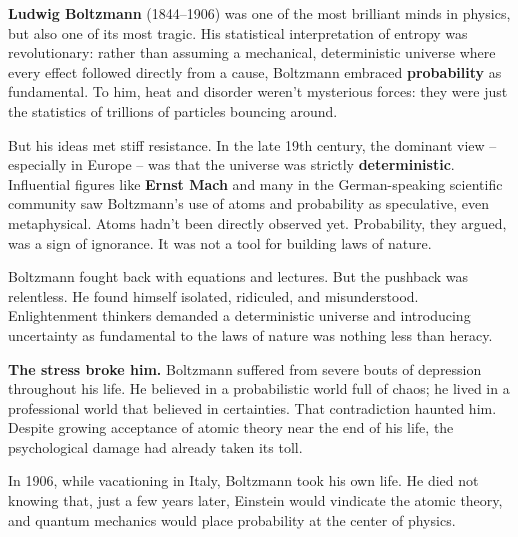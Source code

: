 \begin{tcolorbox}[colback=gray!5!white, colframe=black!75!white, title={Historical Sidebar: Boltzmann vs. the Universe (and the Universe Won)}]

  \textbf{Ludwig Boltzmann} (1844–1906) was one of the most brilliant minds in physics, but also one of its most tragic. His statistical interpretation of entropy was revolutionary: rather than assuming a mechanical, deterministic universe where every effect followed directly from a cause, Boltzmann embraced \textbf{probability} as fundamental. To him, heat and disorder weren’t mysterious forces: they were just the statistics of trillions of particles bouncing around.
  
  \medskip
  
  But his ideas met stiff resistance. In the late 19th century, the dominant view -- especially in Europe -- was that the universe was strictly \textbf{deterministic}. Influential figures like \textbf{Ernst Mach} and many in the German-speaking scientific community saw Boltzmann’s use of atoms and probability as speculative, even metaphysical. Atoms hadn’t been directly observed yet. Probability, they argued, was a sign of ignorance. It was not a tool for building laws of nature.
  
  \medskip
  
  Boltzmann fought back with equations and lectures. But the pushback was relentless. He found himself isolated, ridiculed, and misunderstood. Enlightenment thinkers demanded a deterministic universe and introducing uncertainty as fundamental to the laws of nature was nothing less than heracy.
  
  \medskip
  
  \textbf{The stress broke him.} Boltzmann suffered from severe bouts of depression throughout his life. He believed in a probabilistic world full of chaos; he lived in a professional world that believed in certainties. That contradiction haunted him. Despite growing acceptance of atomic theory near the end of his life, the psychological damage had already taken its toll.
  
  \medskip
  
  In 1906, while vacationing in Italy, Boltzmann took his own life. He died not knowing that, just a few years later, Einstein would vindicate the atomic theory, and quantum mechanics would place probability at the center of physics.
  
\end{tcolorbox}



